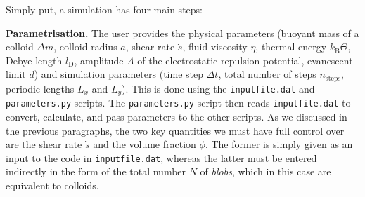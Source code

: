 Simply put, a simulation has four main steps:

\textbf{Parametrisation.} The user provides the physical parameters (buoyant mass of a colloid $\Delta m$, colloid radius $a$, shear rate $\dot s$, fluid viscosity $\eta$, thermal energy $k_\mathrm{B}\Theta$, Debye length $l_\mathrm{D}$, amplitude $A$ of the electrostatic repulsion potential, evanescent limit $d$) and simulation parameters (time step $\Delta t$, total number of steps $n_\mathrm{steps}$, periodic lengths $L_x$ and $L_y$). This is done using the \texttt{inputfile.dat} and \texttt{parameters.py} scripts. The \texttt{parameters.py} script then reads \texttt{inputfile.dat} to convert, calculate, and pass parameters to the other scripts. As we discussed in the previous paragraphs, the two key quantities we must have full control over are the shear rate $\dot s$ and the volume fraction $\phi$. The former is simply given as an input to the code in \texttt{inputfile.dat}, whereas the latter must be entered indirectly in the form of the total number $N$ of \emph{blobs}, which in this case are equivalent to colloids. 


